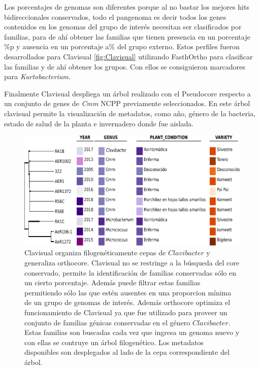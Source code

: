 \documentclass[12pt,twoside]{reedthesis}
\begin{document}
  Los porcentajes de genomas son diferentes porque al no bastar los
  mejores hits bidireccionales conservados, todo el pangenoma es decir
  todos los genes contenidos en los genomas del grupo de interés necesitan
  ser clasificados por familias, para de ahí obtener las familias que
  tienen presencia en un porcentaje \%p y ausencia en un porcentaje a\%
  del grupo externo. Estos perfiles fueron desarrollados para Clavisual
  \autoref{fig:Clavisual} utilizando FasthOrtho para clasificar las
  familias y de ahí obtener los grupos. Con ellos se consiguieron
  marcadores para \emph{Kurtobacterium}.
  
  Finalmente Clavisual despliega un árbol realizado con el Pseudocore
  respecto a un conjunto de genes de \emph{Cmm} NCPP previamente
  seleccionados. En este árbol clavisual permite la visualización de
  metadatos, como año, género de la bacteria, estado de salud de la planta
  e invernadero donde fue aislada.
  
  \begin{figure}[h!tbp]
  \centering
  \includegraphics[angle = 0,scale = .7]{chapter1/Clavisual.pdf}
  \caption[Clavisual organiza cepas de $Clavibacter$ con sus metadatos. ]{\footnotesize{Clavisual organiza filogenéticamente cepas de $Clavibacter$ y generaliza orthocore. Clavisual no se restringe a la búsqueda del core conservado, permite la identificación de familias conservadas sólo en un cierto porcentaje. Además puede filtrar estas familias permitiendo sólo las que estén ausentes en una proporcion mínima de un grupo de genomas de interés. Además orthocore optimiza el funcionamiento de Clavisual ya que fue utilizado para proveer un conjunto de familias génicas conservadas en el género $Clavibacter$. Estas familias son buscadas cada vez que ingresa un genoma nuevo y con ellas se contruye un árbol filogenético. Los metadatos disponibles son desplegados al lado de la cepa correspondiente del árbol.}}
  \label{fig:Clavisual}
  \end{figure}
  
\end{document}
